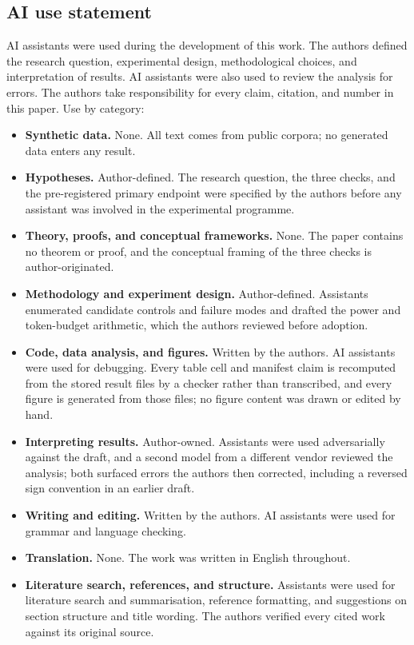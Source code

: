 \documentclass{article} %
\begin{document}
\subsection*{AI use statement}

AI assistants were used during the development of this work. The authors
defined the research question, experimental design, methodological choices,
and interpretation of results. AI assistants were also used to review the
analysis for errors. The authors take responsibility for every claim,
citation, and number in this paper. Use by category:

\begin{itemize}
\setlength{\itemsep}{2pt}
\item \textbf{Synthetic data.} None. All text comes from public corpora; no
generated data enters any result.
\item \textbf{Hypotheses.} Author-defined. The research question, the three
checks, and the pre-registered primary endpoint were specified by the authors
before any assistant was involved in the experimental programme.
\item \textbf{Theory, proofs, and conceptual frameworks.} None. The paper
contains no theorem or proof, and the conceptual framing of the three checks
is author-originated.
\item \textbf{Methodology and experiment design.} Author-defined. Assistants
enumerated candidate controls and failure modes and drafted the power and
token-budget arithmetic, which the authors reviewed before adoption.
\item \textbf{Code, data analysis, and figures.} Written by the authors. AI
assistants were used for debugging. Every table cell and manifest claim is
recomputed from the stored result files by a checker rather than transcribed,
and every figure is generated from those files; no figure content was drawn
or edited by hand.
\item \textbf{Interpreting results.} Author-owned. Assistants were used
adversarially against the draft, and a second model from a different vendor
reviewed the analysis; both surfaced errors the authors then corrected,
including a reversed sign convention in an earlier draft.
\item \textbf{Writing and editing.} Written by the authors. AI assistants were
used for grammar and language checking.
\item \textbf{Translation.} None. The work was written in English throughout.
\item \textbf{Literature search, references, and structure.} Assistants were
used for literature search and summarisation, reference formatting, and
suggestions on section structure and title wording. The authors verified every
cited work against its original source.
\end{itemize}
\end{document}
